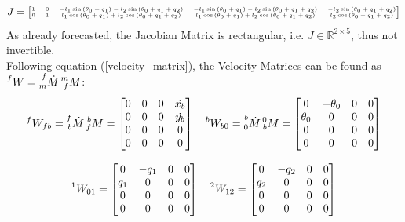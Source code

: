\documentclass[a4paper,12pt,oneside]{report}
\begin{document}
\begin{equation}
  \begin{tiny}
  J=\begin{bmatrix}
    1&0&-l_1\sin{(\theta_0+q_1)}-l_2\sin{(\theta_0+q_1+q_2)}&-l_1\sin{(\theta_0+q_1)}-l_2\sin{(\theta_0+q_1+q_2)}&-l_2\sin{(\theta_0+q_1+q_2)}\\
    0&1&l_1\cos{(\theta_0+q_1)}+l_2\cos{(\theta_0+q_1+q_2)}&l_1\cos{(\theta_0+q_1)}+l_2\cos{(\theta_0+q_1+q_2)}&l_2\cos{(\theta_0+q_1+q_2)}
  \end{bmatrix}
\end{tiny}
\end{equation}
As already forecasted, the Jacobian Matrix is rectangular, i.e. $J\in \mathbb{R}^{2\times5}$, thus not invertible.\\
Following equation (\ref{velocity_matrix}), the Velocity Matrices can be found as $\prescript{f}{}{W}=\prescript{f}{m}{\dot{M}}\prescript{m}{f}{M}$:
\begin{equation}
  \begin{array}{c}
    \prescript{f}{}{W_{fb}}=\prescript{f}{b}{\dot{M}}\prescript{b}{f}{M}=\begin{bmatrix}
      0&0&0&\dot{x_b}\\
      0&0&0&\dot{y_b}\\
      0&0&0&0\\
      0&0&0&0
    \end{bmatrix} \quad
    \prescript{b}{}{W_{b0}}=\prescript{b}{0}{\dot{M}}\prescript{0}{b}{M}=\begin{bmatrix}
      0&-\theta_0&0&0\\
      \theta_0&0&0&0\\
      0&0&0&0\\
      0&0&0&0
    \end{bmatrix}\\ \\
    \prescript{1}{}{W_{01}}=\begin{bmatrix}
      0&-q_1&0&0\\
      q_1&0&0&0\\
      0&0&0&0\\
      0&0&0&0
    \end{bmatrix} \quad
    \prescript{2}{}{W_{12}}=\begin{bmatrix}
      0&-q_2&0&0\\
      q_2&0&0&0\\
      0&0&0&0\\
      0&0&0&0
    \end{bmatrix}
  \end{array}
\end{equation}
\end{document}
